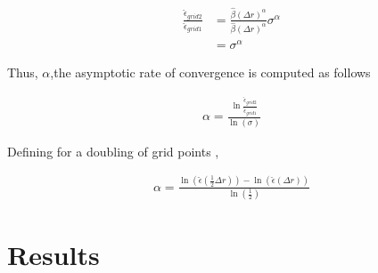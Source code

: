 \begin{align*}
    \frac{\hat{\epsilon}_{grid 2}}{\hat{\epsilon}_{grid 1}} &= 
    \frac{\hat{\beta}(\Delta r )^{\alpha}}{\hat{\beta}(\Delta r )^{\alpha}} \sigma^{\alpha} \\ &= \sigma^{\alpha}
\end{align*}

Thus, $\alpha$,the asymptotic rate of convergence is computed as follows 

\begin{align*}
    \alpha = \frac{
        \ln \frac{
            \hat{\epsilon}_{grid 2}
    }{\hat{\epsilon}_{grid 1} }}
    {\ln\left( \sigma \right) }
\end{align*}

Defining  for a doubling of grid points ,

\begin{align*}
    \alpha = \frac{\ln \left( \hat{\epsilon}\left( \frac{1}{2}\Delta  r\right)
            \right) -\ln \left( \hat{\epsilon}\left( \Delta  r\right)
    \right)}{\ln \left( \frac{1}{2} \right)}
\end{align*}

\section{Results}

\begin{figure}
    \begin{center}
       
    \end{center}
\end{figure}

\begin{figure}
    \begin{center}
        
    \end{center}
\end{figure}

\begin{figure}
    \begin{center}
        
    \end{center}
\end{figure}

\begin{figure}
    \begin{center}
        
    \end{center}
\end{figure}


